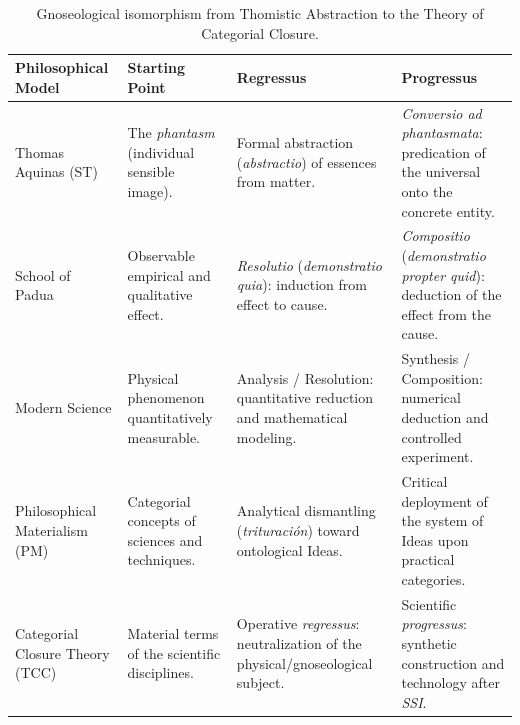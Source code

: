 \documentclass[11pt, a4paper]{article}
\begin{document}
\begin{table}[h!]
    \centering
    \caption{Gnoseological isomorphism from Thomistic Abstraction to the Theory of Categorial Closure.}
    \label{tab:complete_gnoseological_evolution}
    \vspace{0.3cm}
    {\footnotesize
    \begin{tabularx}{\textwidth}{p{3.4cm}YYY}
    \toprule
    \textbf{Philosophical Model} & Starting Point & Regressus & Progressus \\
    \midrule
    Thomas \newline Aquinas (ST) & The \textit{phantasm} (individual sensible image). & Formal abstraction (\textit{abstractio}) of essences from matter. & \textit{Conversio ad phantasmata}: predication of the universal onto the concrete entity. \\
    \addlinespace
    School of \newline Padua & Observable empirical and qualitative effect. & \textit{Resolutio} (\textit{demonstratio quia}): induction from effect to cause. & \textit{Compositio} (\textit{demonstratio propter quid}): deduction of the effect from the cause. \\
    \addlinespace
    Modern \newline Science & Physical phenomenon quantitatively measurable. & Analysis / Resolution: quantitative reduction and mathematical modeling. & Synthesis / Composition: numerical deduction and controlled experiment. \\
    \addlinespace
    Philosophical \newline Materialism (PM) & Categorial concepts of sciences and techniques. & Analytical dismantling (\textit{trituración}) toward ontological Ideas. & Critical deployment of the system of Ideas upon practical categories. \\
    \addlinespace
    Categorial Closure \newline Theory (TCC) & Material terms of the scientific disciplines. & Operative \textit{regressus}: neutralization of the physical/gnoseological subject. & Scientific \textit{progressus}: synthetic construction and technology after \textit{SSI}. \\
    \bottomrule
    \end{tabularx}}
\end{table}
\end{document}
